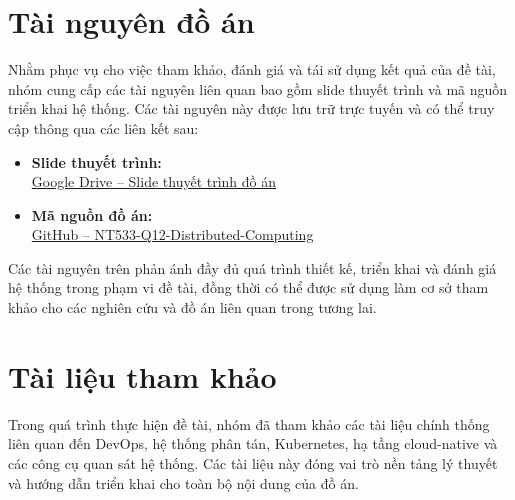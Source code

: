 \clearpage

\section*{Tài nguyên đồ án}
{}

Nhằm phục vụ cho việc tham khảo, đánh giá và tái sử dụng kết quả của đề tài, nhóm
cung cấp các tài nguyên liên quan bao gồm slide thuyết trình và mã nguồn triển khai
hệ thống. Các tài nguyên này được lưu trữ trực tuyến và có thể truy cập thông qua
các liên kết sau:

\begin{itemize}
    \item \textbf{Slide thuyết trình:} \\
    \href{https://drive.google.com/drive/folders/1DX2yMvPsaUAYSylsWpX3x7XvMinTPM6z}
    {Google Drive – Slide thuyết trình đồ án}

    \item \textbf{Mã nguồn đồ án:} \\
    \href{https://github.com/NT533-Q12-Distributed-Computing}
    {GitHub – NT533-Q12-Distributed-Computing}
\end{itemize}

Các tài nguyên trên phản ánh đầy đủ quá trình thiết kế, triển khai và đánh giá hệ
thống trong phạm vi đề tài, đồng thời có thể được sử dụng làm cơ sở tham khảo cho
các nghiên cứu và đồ án liên quan trong tương lai.

\clearpage

\section*{Tài liệu tham khảo}
{}

Trong quá trình thực hiện đề tài, nhóm đã tham khảo các tài liệu chính thống
liên quan đến DevOps, hệ thống phân tán, Kubernetes, hạ tầng cloud-native và
các công cụ quan sát hệ thống. Các tài liệu này đóng vai trò nền tảng lý thuyết
và hướng dẫn triển khai cho toàn bộ nội dung của đồ án.

